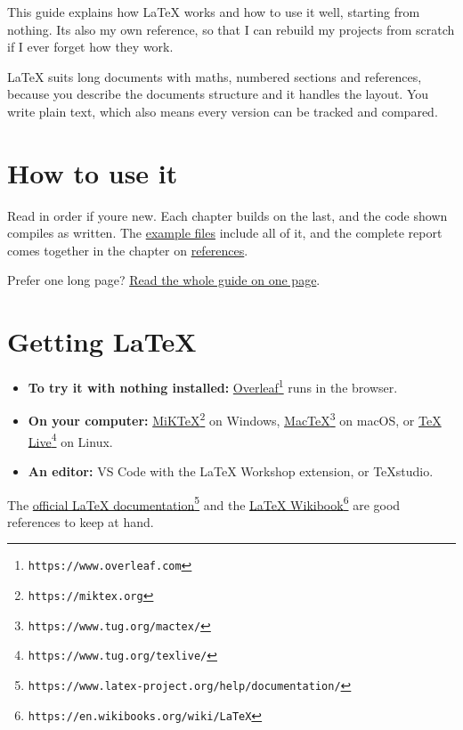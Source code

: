 This guide explains how LaTeX works and how to use it well, starting from nothing. It\textquotesingle s also my own reference, so that I can rebuild my projects from scratch if I ever forget how they work.

LaTeX suits long documents with maths, numbered sections and references, because you describe the document\textquotesingle s structure and it handles the layout. You write plain text, which also means every version can be tracked and compared.

\section{How to use it}\label{how-to-use-it}

Read in order if you\textquotesingle re new. Each chapter builds on the last, and the code shown compiles as written. The \href{examples/latex-examples.zip}{example files} include all of it, and the complete report comes together in the chapter on \href{references/}{references}.

Prefer one long page? \href{full/}{Read the whole guide on one page}.

\section{Getting LaTeX}\label{getting-latex}

\begin{itemize}
\tightlist
\item
  \textbf{To try it with nothing installed:} \href{https://www.overleaf.com}{Overleaf}\footnote{\texttt{https://www.overleaf.com}} runs in the browser.
\item
  \textbf{On your computer:} \href{https://miktex.org}{MiKTeX}\footnote{\texttt{https://miktex.org}} on Windows, \href{https://www.tug.org/mactex/}{MacTeX}\footnote{\texttt{https://www.tug.org/mactex/}} on macOS, or \href{https://www.tug.org/texlive/}{TeX Live}\footnote{\texttt{https://www.tug.org/texlive/}} on Linux.
\item
  \textbf{An editor:} VS Code with the LaTeX Workshop extension, or TeXstudio.
\end{itemize}

The \href{https://www.latex-project.org/help/documentation/}{official LaTeX documentation}\footnote{\texttt{https://www.latex-project.org/help/documentation/}} and the \href{https://en.wikibooks.org/wiki/LaTeX}{LaTeX Wikibook}\footnote{\texttt{https://en.wikibooks.org/wiki/LaTeX}} are good references to keep at hand.

